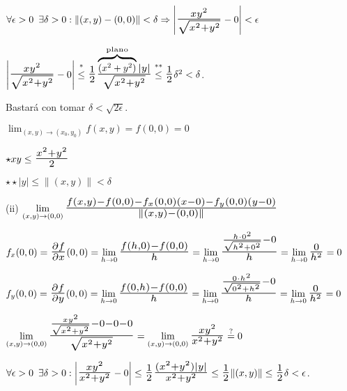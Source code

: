 \documentclass[10pt, titlepage]{article}
\newcommand{\eqc}[1]{\stackrel{\mathclap{\normalfont\mbox{\scriptsize{#1}}}}{=}}
\newcommand{\leqc}[1]{\stackrel{\mathclap{\normalfont\mbox{\scriptsize{#1}}}}{\leq}}
\newcommand{\bfrac}[2]{\scalebox{1.4}{$\frac{#1}{#2}$}}
\newcommand{\spac}{\, \, \,}
\newcommand{\dindent}{\indent\indent}
\begin{document}
\dindent $\forall \epsilon > 0 \spac \exists \delta > 0 : \|(x , y) - (0, 0)\| < \delta \Rightarrow \left | 
\bfrac{xy^2}{\sqrt{x^2 + y^2}} - 0 \right | < \epsilon$
\vspace{3mm}

\dindent $\left | \bfrac{xy^2}{\sqrt{x^2 + y^2}} - 0 \right | \leqc{*} \bfrac{1}{2} 
\bfrac{\overbrace{\scalebox{0.7}{$(x^2 + y^2)$}}^{\text{plano}}|y|}{\sqrt{x^2 + y^2}} \leqc{**} 
\bfrac{1}{2} \delta^2 < \delta$. 
\vspace{3mm}

\dindent Bastará con tomar $\delta < \sqrt{2 \epsilon}$.
\vspace{3mm}

\dindent $\displaystyle \lim_{(x, y) \to (x_0, y_0)} f (x, y) = f (0, 0) = 0$
\vspace{3mm}

\dindent $\star xy \leq \bfrac{x^2 + y^2}{2}$
\vspace{2mm}

\dindent $\star \star |y| \leq \|(x, y)\| < \delta$
\vspace{5mm}

\dindent (ii) $\displaystyle \lim_{(x, y) \to (0, 0)} \bfrac{f (x, y) - f (0, 0) - f_x (0, 0) (x - 0) - f_y (0, 0) (y - 0)} 
{\|(x, y) - (0, 0)\|}$
\vspace{5mm}

\dindent $f_x (0, 0) = \bfrac{\partial f}{\partial x} (0, 0) = \displaystyle \lim_{h \to 0} \bfrac{f (h, 0) - 
f (0, 0)}{h} = \lim_{h \to 0} \bfrac{\frac{h \cdot 0^2}{\sqrt{h^2 + 0^2}} - 0}{h} = \lim_{h \to 0} 
\bfrac{0}{h^2} = 0$
\vspace{3mm}

\dindent $f_y (0, 0) = \bfrac{\partial f}{\partial y} (0, 0)= \displaystyle \lim_{h \to 0} \bfrac{f (0, h) - f (0, 0)}{h} = \lim_{h \to 0} \bfrac{\frac{0 \cdot h^2}{\sqrt{0^2 + h^2}} - 0}{h} = \lim_{h \to 0} 
\bfrac{0}{h^2} = 0$
\vspace{3mm}

\dindent$\displaystyle \lim_{(x, y) \to (0, 0)} \bfrac{\frac{xy^2}{\sqrt{x^2 + y^2}} - 0 - 0 - 0}{\sqrt{x^2 + 
y^2}} = \lim_{(x, y) \to (0, 0)} \bfrac{xy^2}{x^2 + y^2} \eqc{?} 0$
\vspace{3mm}

\dindent$\forall \epsilon >0 \spac \exists \delta > 0 : \left | \bfrac{xy^2}{x^2 + y^2} - 0 \right | \leq 
\bfrac{1}{2} \bfrac{(x^2 + y^2) |y|}{x^2 + y^2} \leq \bfrac{1}{2} \|(x, y)\| \leq \bfrac{1}{2} \delta < 
\epsilon$. \\
\vspace{3mm}
\end{document}
